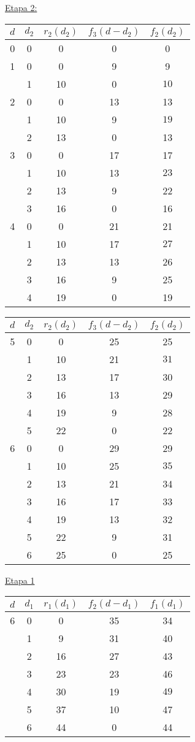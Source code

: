 \documentclass[MIOP.tex]{subfiles}
\begin{document}
\begin{solucion}
\underline{Etapa 2:}
\begin{center}
\begin{tabular}{|c|c|c|c|c|}
\hline
$d$ & $d_2$ & $r_2(d_2)$ & $f_3(d-d_2)$ & $f_2(d_2)$\\
\hline
0 & 0 & 0 & 0 & 0\\
\hline
\hline
1 & 0 & 0 & 9 & 9\\
 & 1 & 10 & 0 & $\boxed{10}$  \\
\hline
\hline
2 & 0 & 0 & 13 & 13 \\
 & 1 & 10 & 9 & $\boxed{19}$\\
 & 2 & 13 & 0 & 13\\
\hline
\hline
3 & 0 & 0 & 17 & 17\\
  & 1 & 10 & 13 & $\boxed{23}$\\
  & 2 & 13 & 9 & 22\\
  & 3 & 16 & 0 & 16\\
\hline
\hline
4 & 0 & 0 & 21 & 21\\
  & 1 & 10 & 17 & $\boxed{27}$\\
  & 2 & 13 & 13& 26\\
  & 3 & 16 & 9 & 25\\
  & 4 & 19 & 0 & 19\\
\hline
\end{tabular}
\begin{tabular}{|c|c|c|c|c|}
\hline
$d$ & $d_2$ & $r_2(d_2)$ & $f_3(d-d_2)$ & $f_2(d_2)$\\
\hline
5 & 0 & 0 & 25 & 25\\
  & 1 & 10 & 21 & $\boxed{31}$\\
  & 2 & 13 & 17 & 30\\
  & 3 & 16 & 13 & 29\\
  & 4 & 19 & 9 & 28\\
  & 5 & 22 & 0 & 22\\
\hline
\hline
6 & 0 & 0 & 29 & 29\\
  & 1 & 10 & 25 & $\boxed{35}$\\
  & 2 & 13 & 21 & 34\\
  & 3 & 16 & 17 & 33\\
  & 4 & 19 & 13 & 32\\
  & 5 & 22 & 9 & 31\\
  & 6 & 25 & 0 & 25\\
\hline

\end{tabular}
\end{center}

\underline{Etapa 1}
\begin{center}
\begin{tabular}{|c|c|c|c|c|}
\hline
$d$ & $d_1$ & $r_1(d_1)$ & $f_2(d-d_1)$ & $f_1(d_1)$\\
\hline
6 & 0 & 0 & 35 & 34\\
  & 1 & 9 & 31 & 40\\
  & 2 & 16 & 27 & 43\\
  & 3 & 23 & 23 & 46\\
  & 4 & 30 & 19 & $\boxed{49}$\\
  & 5 & 37 & 10 & 47\\
  & 6 & 44 & 0 & 44\\
  \hline
  

\end{tabular}
\end{center}
\end{solucion}
\end{document}
